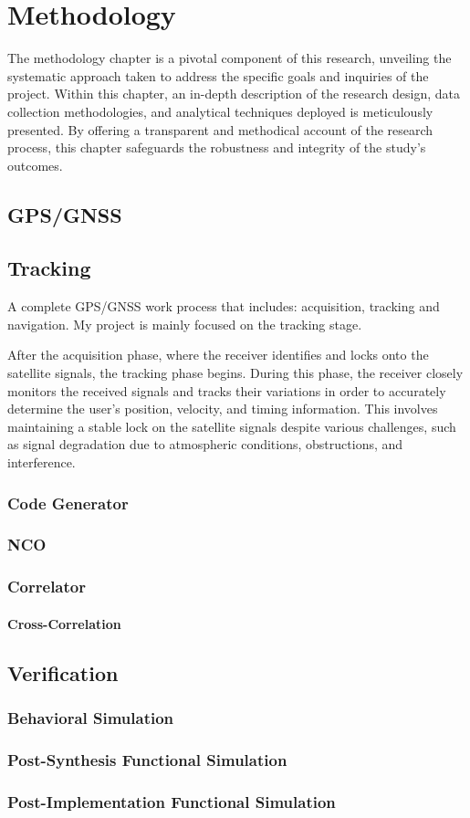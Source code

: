 \chapter{Methodology}
The methodology chapter is a pivotal component of this research, unveiling the systematic approach taken to address the specific goals and inquiries of the project. Within this chapter, an in-depth description of the research design, data collection methodologies, and analytical techniques deployed is meticulously presented. By offering a transparent and methodical account of the research process, this chapter safeguards the robustness and integrity of the study's outcomes.

\section{GPS/GNSS}

\section{Tracking}
A complete GPS/GNSS work process that includes: acquisition, tracking and navigation. My project is mainly focused on the tracking stage.

After the acquisition phase, where the receiver identifies and locks onto the satellite signals, the tracking phase begins. During this phase, the receiver closely monitors the received signals and tracks their variations in order to accurately determine the user's position, velocity, and timing information. This involves maintaining a stable lock on the satellite signals despite various challenges, such as signal degradation due to atmospheric conditions, obstructions, and interference.



\subsection{Code Generator}

\subsection{NCO}

\subsection{Correlator}
\subsubsection{Cross-Correlation}


\section{Verification}
\subsection{Behavioral Simulation}
\subsection{Post-Synthesis Functional Simulation}
\subsection{Post-Implementation Functional Simulation}
